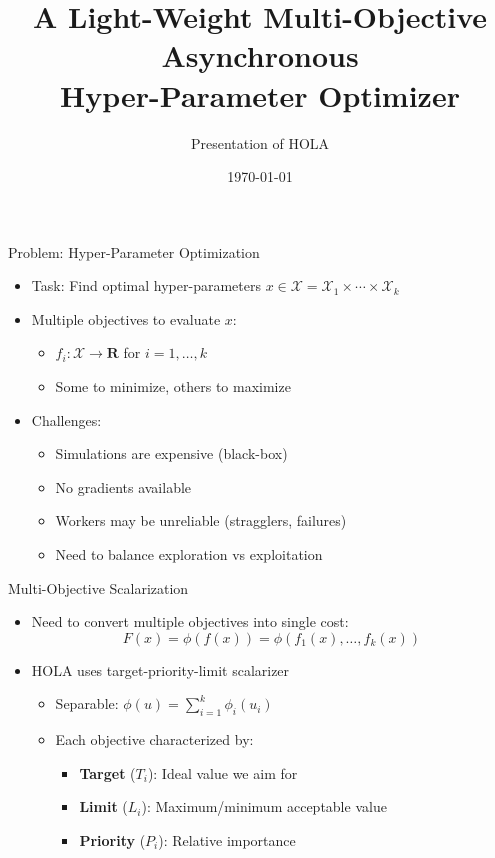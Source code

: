\documentclass{beamer}
\title{A Light-Weight Multi-Objective Asynchronous\\Hyper-Parameter Optimizer}
\author{Presentation of HOLA}
\date{\today}
\begin{document}
\begin{frame}
    \titlepage
\end{frame}

\begin{frame}{Problem: Hyper-Parameter Optimization}
    \begin{itemize}
        \item Task: Find optimal hyper-parameters $x \in \mathcal{X}=\mathcal{X}_1\times\cdots\times\mathcal{X}_k$
        \item Multiple objectives to evaluate $x$:
            \begin{itemize}
                \item $f_i: \mathcal{X} \to \mathbf{R}$ for $i = 1, \ldots, k$
                \item Some to minimize, others to maximize
            \end{itemize}
        \item Challenges:
            \begin{itemize}
                \item Simulations are expensive (black-box)
                \item No gradients available
                \item Workers may be unreliable (stragglers, failures)
                \item Need to balance exploration vs exploitation
            \end{itemize}
    \end{itemize}
\end{frame}

\begin{frame}{Multi-Objective Scalarization}
    \begin{itemize}
        \item Need to convert multiple objectives into single cost:
            \[ F(x) = \phi(f(x)) = \phi(f_1(x), \ldots, f_k(x)) \]
        \item HOLA uses target-priority-limit scalarizer
            \begin{itemize}
                \item Separable: $\phi(u) = \sum_{i=1}^k \phi_i(u_i)$
                \item Each objective characterized by:
                    \begin{itemize}
                        \item \textbf{Target} ($T_i$): Ideal value we aim for
                        \item \textbf{Limit} ($L_i$): Maximum/minimum acceptable value
                        \item \textbf{Priority} ($P_i$): Relative importance
                    \end{itemize}
            \end{itemize}
    \end{itemize}
\end{frame}
\end{document}
